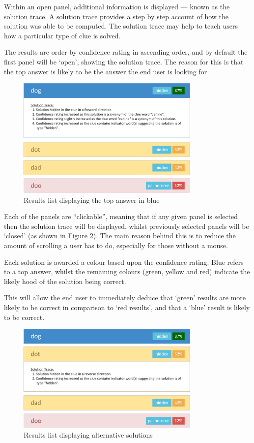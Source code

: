 Within an open panel, additional information is displayed --- known as the 
solution trace. A solution trace provides a step by step account of how the 
solution was able to be computed. The solution trace may help to teach users how
a particular type of clue is solved.

The results are order by confidence rating in ascending order, and by default 
the first panel will be `open', showing the solution trace. The reason for this
is that the top answer is likely to be the answer the end user is looking for

\begin{figure}[H]
  \centering
  \includegraphics[width=0.8\textwidth]{design/ui/results_primary.jpg}
  \caption{Results list displaying the top answer in blue}
  \label{fig:results_primary}
\end{figure}

Each of the panels are ``clickable'', meaning that if any given panel is 
selected then the solution trace will be displayed, whilst previously selected 
panels will be `closed' (as shown in Figure \ref{fig:results_secondary}). The 
main reason behind this is to reduce the amount of scrolling a user has to do, 
especially for those without a mouse.

Each solution is awarded a colour based upon the confidence rating. Blue refers 
to a top answer, whilst the remaining colours (green, yellow and red) indicate 
the likely hood of the solution being correct. 

This will allow the end user to immediately deduce that `green' results are 
more likely to be correct in comparison to `red results', and that a `blue' 
result is likely to be correct.

\begin{figure}[H]
  \centering
  \includegraphics[width=0.8\textwidth]{design/ui/results_secondary.jpg}
  \caption{Results list displaying alternative solutions}
  \label{fig:results_secondary}
\end{figure}
